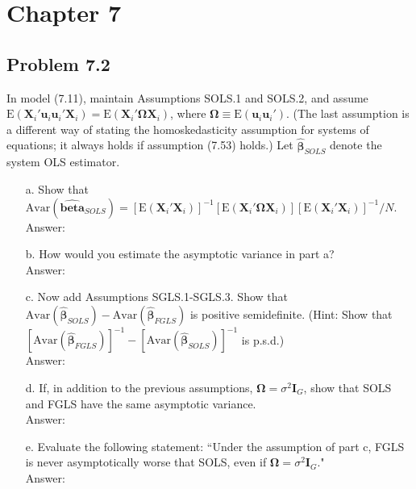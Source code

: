 \documentclass[10pt]{article}
\newcommand{\E}{\text{E}}
\newcommand{\Av}{\text{Avar}}
\begin{document}
\section*{Chapter 7}
\subsection*{Problem 7.2}
In model (7.11), maintain Assumptions SOLS.1 and SOLS.2, and assume $\E(\textbf{X}_i'\textbf{u}_i\textbf{u}_i'\textbf{X}_i)=\E(\textbf{X}_i'\pmb{\Omega}\textbf{X}_i)$, where $\pmb{\Omega}\equiv \E(\textbf{u}_i\textbf{u}_i').$ (The last assumption is a different way of stating the homoskedasticity assumption for systems of equations; it always holds if assumption (7.53) holds.) Let $\hat{\pmb{\beta}}_{SOLS}$ denote the system OLS estimator.
\begin{enumerate}
\item[a.] Show that $\Av(\hat{\pmb{beta}}_{SOLS})=[\E(\textbf{X}_i'\textbf{X}_i)]^{-1}[\E(\textbf{X}_i'\pmb{\Omega}\textbf{X}_i)][\E(\textbf{X}_i'\textbf{X}_i)]^{-1}/N.$
\\ Answer:\\

\item[b.] How would you estimate the asymptotic variance in part a?
\\ Answer:\\

\item[c.] Now add Assumptions SGLS.1-SGLS.3. Show that $\Av(\hat{\pmb{\beta}}_{SOLS})-\Av(\hat{\pmb{\beta}}_{FGLS})$ is positive semidefinite. (Hint: Show that $[\Av(\hat{\pmb{\beta}}_{FGLS})]^{-1}-[\Av(\hat{\pmb{\beta}}_{SOLS})]^{-1}$ is p.s.d.)
\\ Answer:\\

\item[d.] If, in addition to the previous assumptions, $\pmb{\Omega}=\sigma^2 \textbf{I}_G$, show that SOLS and FGLS have the same asymptotic variance.
\\ Answer:\\

\item[e.] Evaluate the following statement: ``Under the assumption of part c, FGLS is never asymptotically worse that SOLS, even if $\pmb{\Omega}=\sigma^2 \textbf{I}_G$."
\\ Answer:\\

\end{enumerate}
\end{document}
